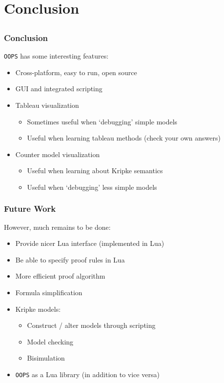 \documentclass{beamer}
\begin{document}
\section{Conclusion}
\subsection{}

\begin{frame}
\frametitle{Conclusion}
{\tt OOPS} has some interesting features:
\begin{itemize}
\item Cross-platform, easy to run, open source
\item GUI and integrated scripting
\item Tableau visualization
	\begin{itemize}
	\item Sometimes useful when `debugging' simple models
	\item Useful when learning tableau methods (check your own answers)
	\end{itemize}
\item Counter model visualization
	\begin{itemize}
	\item Useful when learning about Kripke semantics
	\item Useful when `debugging' less simple models
	\end{itemize}
\end{itemize}
\end{frame}

\begin{frame}
\frametitle{Future Work}
However, much remains to be done:
\begin{itemize}
\item Provide nicer Lua interface (implemented in Lua)
\item Be able to specify proof rules in Lua
\item More efficient proof algorithm
\item Formula simplification
\item Kripke models:
	\begin{itemize}
	\item Construct / alter models through scripting
	\item Model checking
	\item Bisimulation
	\end{itemize}
\item {\tt OOPS} as a Lua library (in addition to vice versa)
\end{itemize}
\end{frame}
\end{document}
